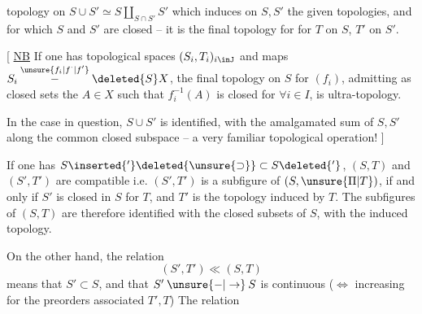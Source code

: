 topology on $S\cup S'\simeq S\amalg_{S\cap S'}S'$ which  induces on $S,S'$ the given topologies, and for which $S$ and $S'$ are closed -- it is the final topology for
for $T$ on $S$, $T'$ on $S'$.

[ \uline{NB} If one has topological spaces $(S_i,T_i)_{i\inJ}$ and maps $S_i\overset{\unsure{f_i|f^{\cdot}|f'}}{\mathbin{-}}\deleted{S}X$, the final topology on $S$ for $(f_i)$, admitting as closed sets the $A\in X$ such that $f_i^{-1}(A)$ is closed for $\forall i\in I$, is  ultra-topology.


In the case in question, $S\cup S'$ is identified, with the amalgamated sum of $S,S'$ along the common closed subspace -- a very familiar topological operation! ]

If one has $S\inserted{'}\deleted{\unsure{\supset}}\subset S\deleted{'}$, $(S,T)$ and $(S',T')$ are compatible i.e. $(S',T')$ is a subfigure of $(S,\unsure{\Pi|T})$, if and only if $S'$ is closed in $S$ for $T$, and $T'$ is the topology induced by $T$. The subfigures of $(S,T)$ are therefore identified with the closed subsets of $S$, with the induced topology.

On the other hand, the relation
\[
 (S',T')\ll(S,T)
\]
means that $S'\subset S$, and that $S'\mathbin{\unsure{-|\to}}S$ is continuous ($\Longleftrightarrow$ increasing for the preorders associated  $T',T$) The relation
